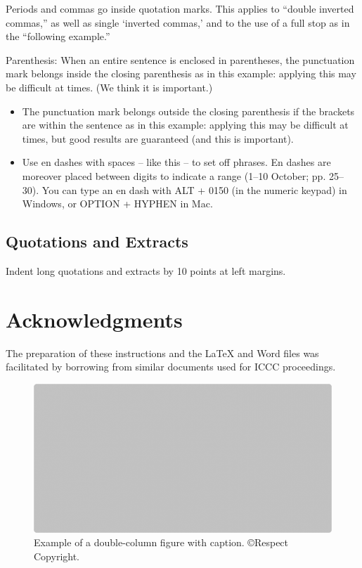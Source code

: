 \documentclass[letterpaper]{article}
\begin{document}
Periods and commas go inside quotation marks. This applies to ``double inverted commas,'' as well as single `inverted commas,' and to the use of a full stop as in the ``following example.'' 

Parenthesis: When an entire sentence is enclosed in parentheses, the punctuation mark belongs inside the closing parenthesis as in this example: applying this may be difficult at times. (We think it is important.)

\begin{itemize}
\item The punctuation mark belongs outside the closing parenthesis if the brackets are within the sentence as in this example: applying this may be difficult at times, but good results are guaranteed (and this is important).
\item Use en dashes with spaces -- like this -- to set off phrases. En dashes are moreover placed between digits to indicate a range (1--10 October; pp. 25--30). You can type an en dash with ALT + 0150 (in the numeric keypad) in Windows, or OPTION + HYPHEN in Mac.
\end{itemize}

\subsection{Quotations and Extracts}
Indent long quotations and extracts by 10 points at left margins.

\section{Acknowledgments}
The preparation of these instructions and the \LaTeX{} and Word files was facilitated by borrowing from similar documents used for ICCC proceedings.

\begin{figure}
\includegraphics[width=\textwidth]{two-column-figure.png}
\caption{Example of a double-column figure with caption. \copyright Respect Copyright.}
\end{figure}
\end{document}
